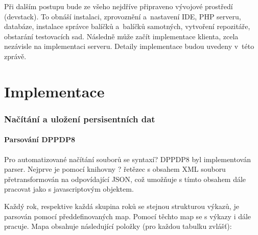 Při dalším postupu bude ze všeho nejdříve připraveno vývojové prostředí (devstack). To obnáší instalaci, zprovoznění a~nastavení IDE, PHP serveru, databáze, instalace správce balíčků a~balíčků samotných, vytvoření repozitáře, obstarání testovacích sad. Následně může začít implementace klienta, zcela nezávisle na implementaci serveru. Detaily implementace budou uvedeny v~této zprávě.





















































\chapter{Implementace}

\subsection{Načítání a uložení persisentních dat}

\subsubsection{Parsování DPPDP8}
Pro automatizované načítání souborů se syntaxí? DPPDP8 byl implementován parser. Nejprve je pomocí knihovny ? řetězec s obsahem XML souboru přetransformován na odpovídající JSON, což umožňuje s tímto obsahem dále pracovat jako s javascriptovým objektem.

Každý rok, respektive každá skupina roků se stejnou strukturou výkazů, je parsován pomocí předdefinovaných map. Pomocí těchto map se s výkazy i dále pracuje. Mapa obsahuje následující položky (pro každou tabulku zvlášť):

